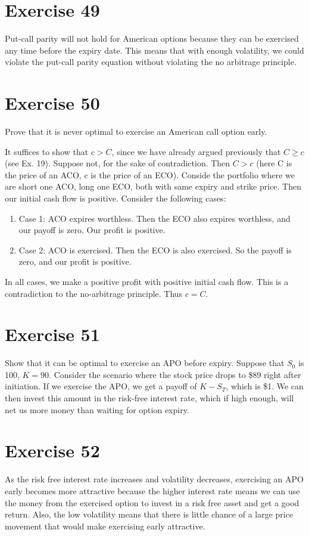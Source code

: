 \documentclass{article}
\begin{document}
\section*{Exercise 49}
Put-call parity will not hold for American options because they can be exercised any time before the expiry date. This means that with enough volatility, we could violate the put-call parity equation without violating the no arbitrage principle.

\section*{Exercise 50}
Prove that it is never optimal to exercise an American call option early.
\begin{flushleft}
    It suffices to show that $c > C$, since we have already argued previously that $C \geq c$ (see Ex. 19). Suppose not, for the sake of contradiction. Then $C > c$ (here C is the price of an ACO, c is the price of an ECO). Conside the portfolio where we are short one ACO, long one ECO, both with same expiry and strike price.
    Then our initial cash flow is positive. Consider the following cases:
    \begin{enumerate}
        \item Case 1: ACO expires worthless. Then the ECO also expires worthless, and our payoff is zero. Our profit is positive.
        \item Case 2: ACO is exercised. Then the ECO is also exercised. So the payoff is zero, and our profit is positive.
    \end{enumerate}
    In all cases, we make a positive profit with positive initial cash flow. This is a contradiction to the no-arbitrage principle. Thus $c = C$.
\end{flushleft}

\section*{Exercise 51}
Show that it can be optimal to exercise an APO before expiry. Suppose that $S_0$ is 100, $K = 90$. Consider the scenario where the stock price drops to \$89 right after initiation.
If we exercise the APO, we get a payoff of $K - S_T$, which is \$1. We can then invest this amount in the risk-free interest rate, which if high enough, will net us more money than waiting for option expiry.

\section*{Exercise 52}
As the risk free interest rate increases and volatility decreases, exercising an APO early becomes more attractive because the higher interest rate means we can use the money from the exercised option to invest in a risk free asset and get a good return. Also, the low volatility means that there is little chance of a large price movement that would make exercising early attractive.
\end{document}

